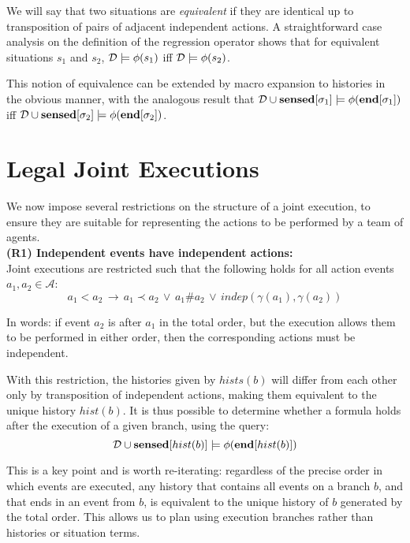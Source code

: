 We will say that two situations are \emph{equivalent} if they are
identical up to transposition of pairs of adjacent independent actions.
A straightforward case analysis on the definition of the regression
operator shows that for equivalent situations $s_{1}$ and $s_{2}$,
$\mathcal{D}\models\phi(s_{1})$ iff $\mathcal{D}\models\phi(s_{2})$.

This notion of equivalence can be extended by macro expansion to histories
in the obvious manner, with the analogous result that $\mathcal{D}\cup\mathbf{sensed}[\sigma_{1}]\models\phi(\mathbf{end}[\sigma_{1}])$
iff $\mathcal{D}\cup\mathbf{sensed}[\sigma_{2}]\models\phi(\mathbf{end}[\sigma_{2}])$.


\section{Legal Joint Executions\label{sec:JointExec:Legal}}

We now impose several restrictions on the structure of a joint execution,
to ensure they are suitable for representing the actions to be performed
by a team of agents.\\


\textbf{(R1) Independent events have independent actions:}\\
 Joint executions are restricted such that the following holds for
all action events $a_{1},a_{2}\in\mathcal{A}$:\[
a_{1}<a_{2}\,\rightarrow\, a_{1}\prec a_{2}\,\vee\, a_{1}\#a_{2}\,\vee\, indep(\gamma(a_{1}),\gamma(a_{2}))\]


In words: if event $a_{2}$ is after $a_{1}$ in the total order,
but the execution allows them to be performed in either order, then
the corresponding actions must be independent.

With this restriction, the histories given by $hists(b)$ will differ
from each other only by transposition of independent actions, making
them equivalent to the unique history $hist(b)$. It is thus possible
to determine whether a formula holds after the execution of a given
branch, using the query:\[
\mathcal{D}\cup\mathbf{sensed}[hist(b)]\models\phi(\mathbf{end}[hist(b)])\]


This is a key point and is worth re-iterating: regardless of the precise
order in which events are executed, any history that contains all
events on a branch $b$, and that ends in an event from $b$, is equivalent
to the unique history of $b$ generated by the total order. This allows
us to plan using execution branches rather than histories or situation
terms.\\


